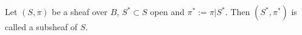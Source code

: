 Let $(S, \pi)$ be a sheaf over $B$, $S^* \subset S$ open and $\pi^* := \pi|S^*$. Then $(S^*, \pi^*)$ is called a subsheaf of $S$.
